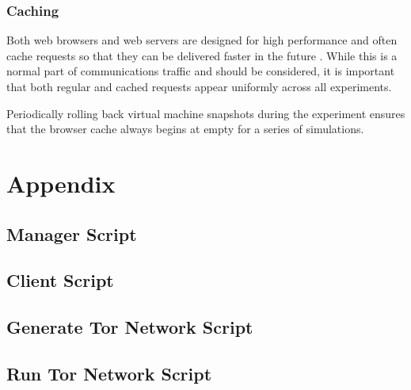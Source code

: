 \documentclass{ecuthesis}
\begin{document}
\subsection{Caching}

Both web browsers and web servers are designed for high performance and often
cache requests so that they can be delivered faster in the future
\parencite{Caceres:1998p7419}. While this is a normal part of communications
traffic and should be considered, it is important that both regular and cached
requests appear uniformly across all experiments.

Periodically rolling back virtual machine snapshots during the experiment
ensures that the browser cache always begins at empty for a series of
simulations.





\chapter{Appendix}

\section{Manager Script}

\label{manager-script}


\section{Client Script}

\label{client-script}


\section{Generate Tor Network Script}

\label{generate-tor-network-script}


\section{Run Tor Network Script}

\label{run-tor-network-script}


\printbibliography[title=REFERENCES]
\end{document}

